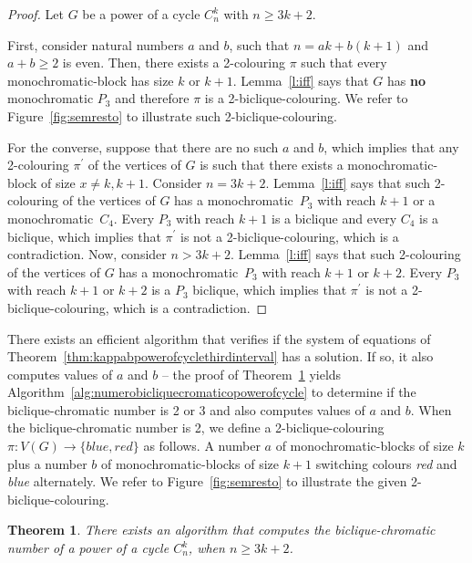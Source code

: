 \documentclass{article}
\newtheorem{theorem}{Theorem}
\begin{document}
\begin{proof}
Let $G$ be a power of a cycle $C_n^k$ with $n \geq 3k + 2$.

First, consider natural numbers $a$ and $b$, such that $n = ak + b(k+1)$ and $a
+ b \geq 2$ is even. Then, there exists a 2-colouring $\pi$ such that every
monochromatic-block has size $k$ or $k+1$. Lemma~\ref{l:iff} says that $G$ has 
\textbf{no} monochromatic $P_{3}$ and therefore $\pi$ is a 2-biclique-colouring.
We refer to Figure~\ref{fig:semresto} to illustrate such 2-biclique-colouring.

For the converse, suppose that there are no such $a$ and $b$, which implies
that any 2-colouring $\pi^\prime$ of the vertices of $G$ is such that there
exists a monochromatic-block of size $x \neq k, k+1$. Consider $n = 3k +
2$. Lemma~\ref{l:iff} says that such 2-colouring of the vertices of $G$ has
a monochromatic~$P_{3}$ with reach $k+1$ or a monochromatic~$C_{4}$. Every
$P_3$ with reach $k+1$ is a biclique and every $C_4$ is a biclique, which
implies that $\pi^\prime$ is not a 2-biclique-colouring, which is a contradiction.
Now, consider $n > 3k + 2$. Lemma~\ref{l:iff} says that such 2-colouring of
the vertices of $G$ has a monochromatic~$P_{3}$ with reach $k+1$ or $k+2$. Every
$P_3$ with reach $k+1$ or $k+2$ is a $P_3$ biclique, which implies that
$\pi^\prime$ is not a 2-biclique-colouring, which is a contradiction.
\end{proof}

 There exists an efficient algorithm that verifies if the system of equations of
 Theorem~\ref{thm:kappabpowerofcyclethirdinterval} has a solution. If so,
 it also computes values of $a$ and $b$ -- the proof of
 Theorem~\ref{thm:algoritmopowerofcycle} yields
 Algorithm~\ref{alg:numerobicliquecromaticopowerofcycle} to determine if the
 biclique-chromatic number is 2 or 3 and also computes values of $a$ and $b$.
 When the biclique-chromatic number is 2, we define a 2-biclique-colouring
 $\pi:V(G)\rightarrow\{blue,red\}$ as follows. A number $a$ of monochromatic-blocks
 of size $k$ plus a number $b$ of monochromatic-blocks of size $k + 1$ switching
 colours \emph{red} and \emph{blue} alternately. We refer to
 Figure~\ref{fig:semresto} to illustrate the given 2-biclique-colouring. 


\begin{theorem}
\label{thm:algoritmopowerofcycle}
 There exists an algorithm that computes the biclique-chromatic
 number of a power of a cycle $C_n^k$, when $n \geq 3k + 2$.
\end{theorem}
\end{document}
